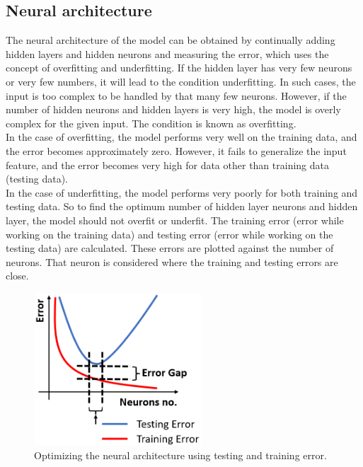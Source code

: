 \documentclass[12pt,a4paper,bold]{thesis}
\theoremstyle{thm}
\theoremstyle{definition}
\begin{document}
\subsection{Neural architecture}
\indent \indent\indent The neural architecture of the model can be obtained by continually adding hidden layers and hidden neurons and measuring the error, which uses the concept of overfitting and underfitting. If the hidden layer has very few neurons or very few numbers, it will lead to the condition underfitting. In such cases, the input is too complex to be handled by that many few neurons. However, if the number of hidden neurons and hidden layers is very high, the model is overly complex for the given input. The condition is known as overfitting.\\ 
\indent \indent In the case of overfitting, the model performs very well on the training data, and the error becomes approximately zero. However, it fails to generalize the input feature, and the error becomes very high for data other than training data (testing data).\\ 
\indent \indent In the case of underfitting, the model performs very poorly for both training and testing data. 
So to find the optimum number of hidden layer neurons and hidden layer, the model should not overfit or underfit. The training error (error while working on the training data) and testing error (error while working on the testing data) are calculated. These errors are plotted against the number of neurons. That neuron is considered where the training and testing errors are close.
\begin{figure}[H]
	\centering
   \includegraphics[height=5.7cm]{Images/39.png} 
   \caption{Optimizing the neural architecture using testing and training error.}
\end{figure}
\end{document}
